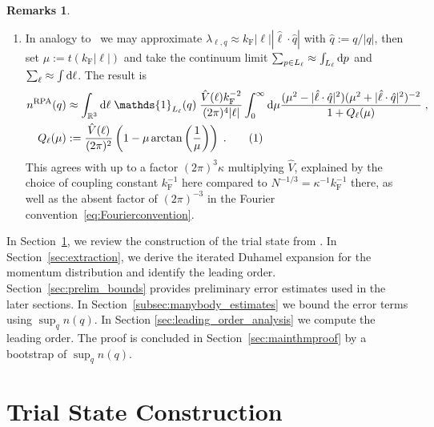 \documentclass[12pt,a4paper]{article}
\numberwithin{equation}{section}
\newcommand{\1}{\mathbb{I}}
\newcommand{\di}{\textnormal{d}}
\newcommand{\F}{\mathrm{F}}
\newcommand{\RPA}{\mathrm{RPA}}
\newcommand{\tagg}[1]{ \stepcounter{equation} \tag{\theequation}
\label{#1} } %
\newcommand{\R}{\mathbb{R}}
\theoremstyle{plain}
\theoremstyle{definition}
\newtheorem*{remarks}{Remarks}
\theoremstyle{remark}
\theoremstyle{plain}
\theoremstyle{definition}
\theoremstyle{remark}
\begin{document}
\begin{remarks}
\begin{enumerate}
\item In analogy to~\cite[Section~1.1]{BL25} we may approximate $ \lambda_{\ell,q} \approx k_{\F} |\ell| |\hat{\ell} \cdot \hat{q}| $ with $ \hat{q} := {q}/{|q|} $, then set $ \mu := t (k_{\F} |\ell|) $ and take the continuum limit $ \sum_{p \in L_\ell} \approx \int_{L_\ell} \di p $ and $ \sum_\ell \approx \int \di \ell $. The result is
\begin{align*}
	n^{\RPA}(q)
	&\approx \int_{\R^3} \di \ell \; \mathds{1}_{L_{\ell}}(q) \; \frac{\hat{V}(\ell) k_{\F}^{-2}}{(2 \pi)^4 |\ell|}
		\int_0^\infty \di \mu \frac{(\mu^2-|\hat{\ell} \cdot \hat{q}|^2) (\mu^2 + |\hat{\ell} \cdot \hat{q}|^2)^{-2}}{1 + Q_\ell(\mu)} \;, \\
	Q_\ell(\mu) &:= \frac{\hat{V}(\ell)}{(2 \pi)^2} \left( 1 - \mu \arctan \left( \frac{1}{\mu} \right) \right) \;. \tagg{eq:Q}
\end{align*}
This agrees with \cite{BL25} up to a factor $ (2 \pi)^3 \kappa $ multiplying $\hat{V}$, explained by the choice of coupling constant $k_\F^{-1}$ here compared to $N^{-1/3} = \kappa^{-1} k_{\F}^{-1}$ there, as well as the absent factor of $ (2 \pi)^{-3} $ in the Fourier convention~\eqref{eq:Fourierconvention}.
\end{enumerate}
\end{remarks}

In Section~\ref{sec:trialstate}, we review the construction of the trial state from \cite{CHN23}. In Section~\ref{sec:extraction}, we derive the iterated Duhamel expansion for the momentum distribution and identify the leading order. Section~\ref{sec:prelim_bounds} provides preliminary error estimates used in the later sections. In Section~\ref{subsec:manybody_estimates} we bound the error terms using $\sup_q n(q)$. In Section \ref{sec:leading_order_analysis} we compute the leading order. The proof is concluded in Section~\ref{sec:mainthmproof} by a bootstrap of $\sup_q n(q)$.





\section{Trial State Construction}
\label{sec:trialstate}
\end{document}
